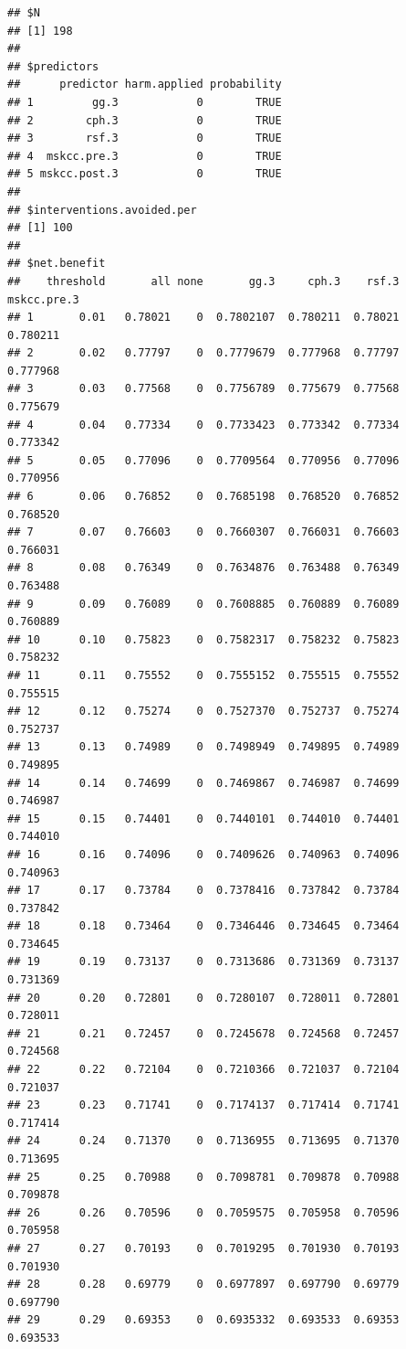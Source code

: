 \documentclass{article}\usepackage[]{graphicx}\usepackage[]{color}
\makeatletter
\newenvironment{kframe}{%
 \def\at@end@of@kframe{}%
 \ifinner\ifhmode%
  \def\at@end@of@kframe{\end{minipage}}%
  \begin{minipage}{\columnwidth}%
 \fi\fi%
 \def\FrameCommand##1{\hskip\@totalleftmargin \hskip-\fboxsep
 \colorbox{shadecolor}{##1}\hskip-\fboxsep
     \hskip-\linewidth \hskip-\@totalleftmargin \hskip\columnwidth}%
 \MakeFramed {\advance\hsize-\width
   \@totalleftmargin\z@ \linewidth\hsize
   \@setminipage}}%
 {\par\unskip\endMakeFramed%
 \at@end@of@kframe}
\newenvironment{knitrout}{}{} %
\makeatother
\begin{document}
\begin{knitrout}
\begin{kframe}\begin{verbatim}
## $N
## [1] 198
## 
## $predictors
##      predictor harm.applied probability
## 1         gg.3            0        TRUE
## 2        cph.3            0        TRUE
## 3        rsf.3            0        TRUE
## 4  mskcc.pre.3            0        TRUE
## 5 mskcc.post.3            0        TRUE
## 
## $interventions.avoided.per
## [1] 100
## 
## $net.benefit
##    threshold       all none       gg.3     cph.3    rsf.3 mskcc.pre.3
## 1       0.01   0.78021    0  0.7802107  0.780211  0.78021    0.780211
## 2       0.02   0.77797    0  0.7779679  0.777968  0.77797    0.777968
## 3       0.03   0.77568    0  0.7756789  0.775679  0.77568    0.775679
## 4       0.04   0.77334    0  0.7733423  0.773342  0.77334    0.773342
## 5       0.05   0.77096    0  0.7709564  0.770956  0.77096    0.770956
## 6       0.06   0.76852    0  0.7685198  0.768520  0.76852    0.768520
## 7       0.07   0.76603    0  0.7660307  0.766031  0.76603    0.766031
## 8       0.08   0.76349    0  0.7634876  0.763488  0.76349    0.763488
## 9       0.09   0.76089    0  0.7608885  0.760889  0.76089    0.760889
## 10      0.10   0.75823    0  0.7582317  0.758232  0.75823    0.758232
## 11      0.11   0.75552    0  0.7555152  0.755515  0.75552    0.755515
## 12      0.12   0.75274    0  0.7527370  0.752737  0.75274    0.752737
## 13      0.13   0.74989    0  0.7498949  0.749895  0.74989    0.749895
## 14      0.14   0.74699    0  0.7469867  0.746987  0.74699    0.746987
## 15      0.15   0.74401    0  0.7440101  0.744010  0.74401    0.744010
## 16      0.16   0.74096    0  0.7409626  0.740963  0.74096    0.740963
## 17      0.17   0.73784    0  0.7378416  0.737842  0.73784    0.737842
## 18      0.18   0.73464    0  0.7346446  0.734645  0.73464    0.734645
## 19      0.19   0.73137    0  0.7313686  0.731369  0.73137    0.731369
## 20      0.20   0.72801    0  0.7280107  0.728011  0.72801    0.728011
## 21      0.21   0.72457    0  0.7245678  0.724568  0.72457    0.724568
## 22      0.22   0.72104    0  0.7210366  0.721037  0.72104    0.721037
## 23      0.23   0.71741    0  0.7174137  0.717414  0.71741    0.717414
## 24      0.24   0.71370    0  0.7136955  0.713695  0.71370    0.713695
## 25      0.25   0.70988    0  0.7098781  0.709878  0.70988    0.709878
## 26      0.26   0.70596    0  0.7059575  0.705958  0.70596    0.705958
## 27      0.27   0.70193    0  0.7019295  0.701930  0.70193    0.701930
## 28      0.28   0.69779    0  0.6977897  0.697790  0.69779    0.697790
## 29      0.29   0.69353    0  0.6935332  0.693533  0.69353    0.693533

\end{verbatim}
\end{kframe}
\end{knitrout}
\end{document}
